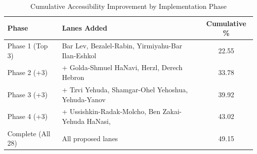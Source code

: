 \begin{table}[H]
\centering
\caption{Cumulative Accessibility Improvement by Implementation Phase}
\label{tab:phases}
\begin{tabular}{@{}llc@{}}
\toprule
\textbf{Phase} & \textbf{Lanes Added} & \textbf{Cumulative \%} \\
\midrule
Phase 1 (Top 3) & Bar Lev, Bezalel-Rabin, Yirmiyahu-Bar Ilan-Eshkol & 22.55 \\
Phase 2 (+3) & + Golda-Shmuel HaNavi, Herzl, Derech Hebron & 33.78 \\
Phase 3 (+3) & + Tzvi Yehuda, Shamgar-Ohel Yehoshua, Yehuda-Yanov & 39.92 \\
Phase 4 (+3) & + Ussishkin-Radak-Molcho, Ben Zakai-Yehuda HaNasi, & 43.02 \\
Complete (All 28) & All proposed lanes & 49.15 \\
\bottomrule
\end{tabular}
\end{table}


